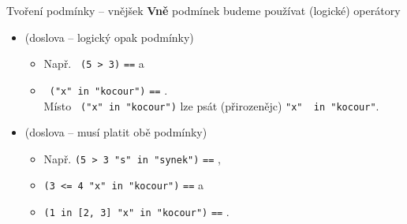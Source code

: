 \begin{frame}{Tvoření podmínky -- vnějšek}
 \textbf{Vně} podmínek budeme používat (logické) operátory
 \begin{itemize}
  \item<1-> \texttt{} (doslova  -- logický opak podmínky)
   \begin{itemize}
    \item Např. \texttt{ (5 > 3)} \texttt{==} \texttt{} a
    \item \texttt{ ("x"~in "kocour")} \texttt{==} \texttt{}.\\
     Místo \texttt{ ("x"~in "kocour")} lze psát (přirozenějc)
     \texttt{"x"~ in "kocour"}.
   \end{itemize}
  \item<2->  (doslova  -- musí platit obě podmínky)
   \begin{itemize}
    \item Např. \texttt{(5 > 3  "s"~in "synek")} \texttt{==}
     \texttt{},
    \item \texttt{(3 <= 4  "x"~in "kocour")} \texttt{==}
     \texttt{} a
    \item \texttt{(1 in [2, 3]  "x"~in "kocour")} \texttt{==}
     \texttt{}.
   \end{itemize}
 \end{itemize}
\end{frame}
